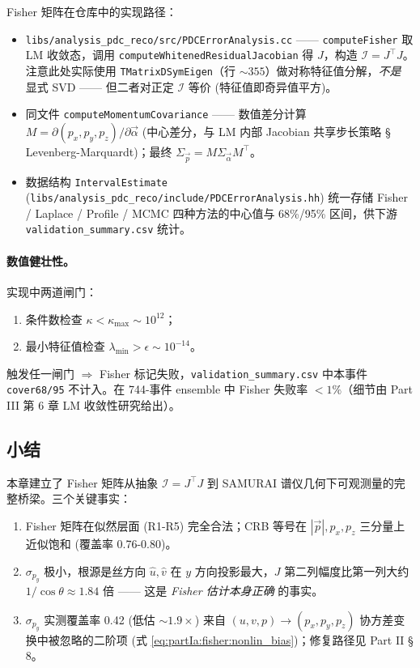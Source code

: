 Fisher 矩阵在仓库中的实现路径：
\begin{itemize}[nosep]
  \item \texttt{libs/analysis\_pdc\_reco/src/PDCErrorAnalysis.cc} —— \texttt{computeFisher} 取 LM 收敛态，调用 \texttt{computeWhitenedResidualJacobian} 得 $J$，构造 $\mathcal I=J^\top J$。注意此处实际使用 \texttt{TMatrixDSymEigen}（行 $\sim 355$）做对称特征值分解，\emph{不是} 显式 SVD —— 但二者对正定 $\mathcal I$ 等价 (特征值即奇异值平方)。
  \item 同文件 \texttt{computeMomentumCovariance} —— 数值差分计算 $M=\partial(p_x,p_y,p_z)/\partial\vec\alpha$ (中心差分，与 LM 内部 Jacobian 共享步长策略 \StatusReport § Levenberg-Marquardt)；最终 $\Sigma_{\vec p}=M\Sigma_{\vec\alpha}M^\top$。
  \item 数据结构 \texttt{IntervalEstimate} (\texttt{libs/analysis\_pdc\_reco/include/PDCErrorAnalysis.hh}) 统一存储 Fisher / Laplace / Profile / MCMC 四种方法的中心值与 68\%/95\% 区间，供下游 \texttt{validation\_summary.csv} 统计。
\end{itemize}

\paragraph{数值健壮性。} 实现中两道闸门：
\begin{enumerate}[nosep]
  \item 条件数检查 $\kappa<\kappa_\mathrm{max}\sim 10^{12}$；
  \item 最小特征值检查 $\lambda_\mathrm{min}>\epsilon\sim 10^{-14}$。
\end{enumerate}
触发任一闸门 $\Rightarrow$ Fisher 标记失败，\texttt{validation\_summary.csv} 中本事件 \texttt{cover68/95} 不计入。在 744-事件 ensemble 中 Fisher 失败率 $<1\%$（细节由 Part III 第 6 章 LM 收敛性研究给出）。

\subsection{小结}
\label{sec:partIa:fisher:summary}

本章建立了 Fisher 矩阵从抽象 $\mathcal I=J^\top J$ 到 SAMURAI 谱仪几何下可观测量的完整桥梁。三个关键事实：
\begin{enumerate}[nosep]
  \item Fisher 矩阵在似然层面 (R1-R5) 完全合法；CRB 等号在 $|\vec p|, p_x, p_z$ 三分量上近似饱和 (覆盖率 0.76-0.80)。
  \item $\sigma_{p_y}$ 极小，根源是丝方向 $\hat u,\hat v$ 在 $y$ 方向投影最大，$J$ 第二列幅度比第一列大约 $1/\cos\theta\approx 1.84$ 倍 —— 这是 \emph{Fisher 估计本身正确} 的事实。
  \item $\sigma_{p_y}$ 实测覆盖率 0.42 (低估 $\sim 1.9\times$) 来自 $(u,v,p)\to(p_x,p_y,p_z)$ 协方差变换中被忽略的二阶项 (式 \eqref{eq:partIa:fisher:nonlin_bias})；修复路径见 Part II § 8。
\end{enumerate}

